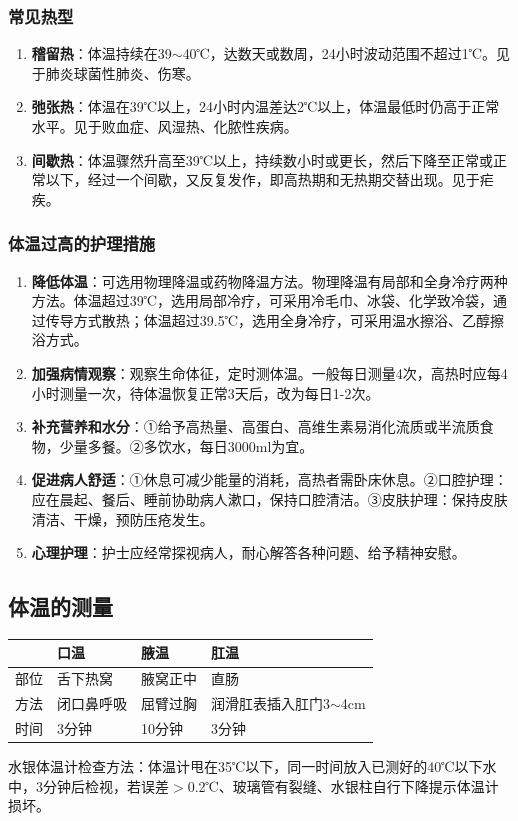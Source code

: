\documentclass[11pt, a4paper]{ctexart}
\begin{document}
\subsubsection{常见热型}
\begin{enumerate}
	\item \textbf{稽留热}：体温持续在39$\sim$40℃，达数天或数周，24小时波动范围不超过1℃。见于肺炎球菌性肺炎、伤寒。
	\item \textbf{弛张热}：体温在39℃以上，24小时内温差达2℃以上，体温最低时仍高于正常水平。见于败血症、风湿热、化脓性疾病。
	\item \textbf{间歇热}：体温骤然升高至39℃以上，持续数小时或更长，然后下降至正常或正常以下，经过一个间歇，又反复发作，即高热期和无热期交替出现。见于疟疾。
\end{enumerate}

\subsubsection{体温过高的护理措施}
\begin{enumerate}
	\item \textbf{降低体温}：可选用物理降温或药物降温方法。物理降温有局部和全身冷疗两种方法。体温超过39℃，选用局部冷疗，可采用冷毛巾、冰袋、化学致冷袋，通过传导方式散热；体温超过39.5℃，选用全身冷疗，可采用温水擦浴、乙醇擦浴方式。
	\item \textbf{加强病情观察}：观察生命体征，定时测体温。一般每日测量4次，高热时应每4小时测量一次，待体温恢复正常3天后，改为每日1-2次。
	\item \textbf{补充营养和水分}：①给予高热量、高蛋白、高维生素易消化流质或半流质食物，少量多餐。②多饮水，每日3000ml为宜。
	\item \textbf{促进病人舒适}：①休息可减少能量的消耗，高热者需卧床休息。②口腔护理：应在晨起、餐后、睡前协助病人漱口，保持口腔清洁。③皮肤护理：保持皮肤清洁、干燥，预防压疮发生。
	\item \textbf{心理护理}：护士应经常探视病人，耐心解答各种问题、给予精神安慰。
\end{enumerate}

\subsection{体温的测量}
\begin{table}[htbp]
	\centering
	\begin{tabular}{|l|l|l|l|}
		\hline
		   & \textbf{口温} & \textbf{腋温} & \textbf{肛温}        \\
		\hline
		部位 & 舌下热窝        & 腋窝正中        & 直肠                 \\
		方法 & 闭口鼻呼吸       & 屈臂过胸        & 润滑肛表插入肛门3$\sim$4cm \\
		时间 & 3分钟         & 10分钟        & 3分钟                \\
		\hline
	\end{tabular}
\end{table}
水银体温计检查方法：体温计甩在35℃以下，同一时间放入已测好的40℃以下水中，3分钟后检视，若误差$>$0.2℃、玻璃管有裂缝、水银柱自行下降提示体温计损坏。
\end{document}
